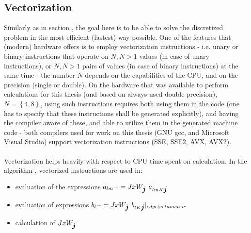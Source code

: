 \subsection{Vectorization}
Similarly as in section , the goal here is to be able to solve the discretized problem in the most efficient (fastest) way possible. One of the features that (modern) hardware offers is to employ vectorization instructions - i.e. unary or binary instructions that operate on $N, N > 1$ values (in case of unary instructions), or $N, N > 1$ pairs of values (in case of binary instructions) at the same time - the number $N$ depends on the capabilities of the CPU, and on the precision (single or double). On the hardware that was available to perform calculations for this thesis (and based on always-used double precision), $N = \left\{4, 8\right\}$, using such instructions requires both using them in the code (one has to specify that these instructions shall be generated explicitly), and having the compiler aware of these, and able to utilize them in the generated machine code - both compilers used for work on this thesis (GNU gcc, and Microsoft Visual Studio) support vectorization instructions (SSE, SSE2, AVX, AVX2).
\paragraph{}
Vectorization helps heavily with respect to CPU time spent on calculation. In the algorithm , vectorized instructions are used in:
\begin{itemize}
    \item evaluation of the expressions $a_{lm} += JxW_{\mbox{\boldmath $j$}} \ a_{lm K \mbox{\boldmath $j$}}$
    \item evaluation of expressions $b_{l} += JxW_{\mbox{\boldmath $j$}} \ b_{l K \mbox{\boldmath $j$}}|_{edge|volumetric}$
    \item calculation of $JxW_{\mbox{\boldmath $j$}}$
\end{itemize}